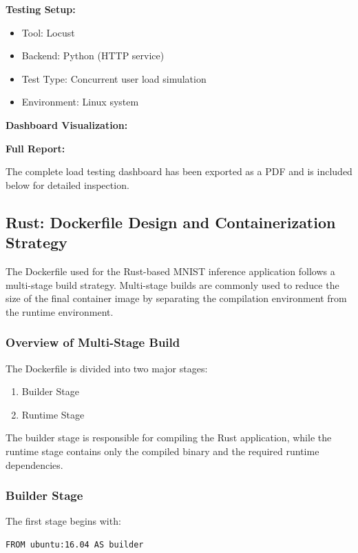 \documentclass[10pt,a4paper,twocolumn]{article}
\begin{document}
\textbf{Testing Setup:}
\begin{itemize}
    \item Tool: Locust
    \item Backend: Python (HTTP service)
    \item Test Type: Concurrent user load simulation
    \item Environment: Linux system
\end{itemize}

\textbf{Dashboard Visualization:}

\textbf{Full Report:}

The complete load testing dashboard has been exported as a PDF and is included below for detailed inspection.




\subsection{Rust: Dockerfile Design and Containerization Strategy}

The Dockerfile used for the Rust-based MNIST inference application follows a multi-stage build strategy. Multi-stage builds are commonly used to reduce the size of the final container image by separating the compilation environment from the runtime environment.

\subsubsection{Overview of Multi-Stage Build}

The Dockerfile is divided into two major stages:

\begin{enumerate}
    \item Builder Stage
    \item Runtime Stage
\end{enumerate}

The builder stage is responsible for compiling the Rust application, while the runtime stage contains only the compiled binary and the required runtime dependencies.

\subsubsection{Builder Stage}

The first stage begins with:

\begin{verbatim}
FROM ubuntu:16.04 AS builder
\end{verbatim}
\end{document}
